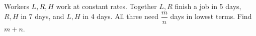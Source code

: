 Workers $L,R,H$ work at constant rates. Together $L,R$ finish a job in 5 days, $R,H$ in 7 days, and $L,H$ in 4 days. All three need $\dfrac{m}{n}$ days in lowest terms. Find $m+n$.
